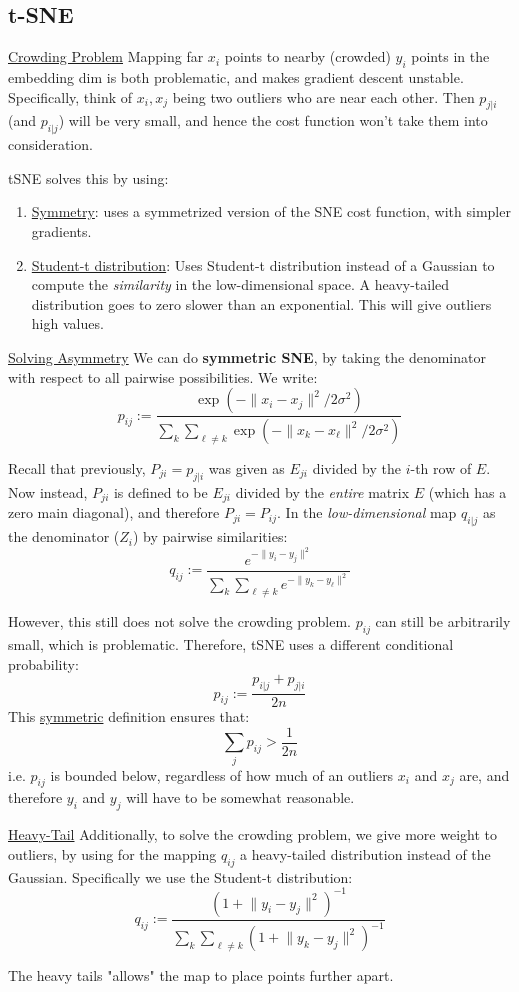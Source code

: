 \documentclass{article}
\begin{document}
\subsection{t-SNE}
\ul{Crowding Problem} Mapping far $x_i$ points to nearby (crowded) $y_i$  points in the embedding dim is both problematic, and makes gradient descent unstable. Specifically, think of $x_i, x_j$ being two outliers who are near each other. Then $p_{j|i}$ (and $p_{i|j}$) will be very small, and hence the cost function won't take them into consideration. 

tSNE solves this by using:
\begin{enumerate}

  \item \ul{Symmetry}: uses a symmetrized version of the SNE cost function, with simpler gradients.
  \item \ul{Student-t distribution}: Uses Student-t distribution instead of a Gaussian to compute the \textit{similarity} in the low-dimensional space. A heavy-tailed distribution goes to zero slower than an exponential. This will give outliers high values.  

\end{enumerate}


\ul{Solving Asymmetry} We can do \textbf{symmetric SNE}, by taking the denominator with respect to all pairwise possibilities. We write:
\[
  p_{ij} := \frac{\exp(- \lVert x_i -x_j \rVert^2 / 2 \sigma ^2) } {\sum_{k} \sum_{\ell \neq k } \exp(- \lVert x_k - x_{\ell} \rVert ^2 / 2 \sigma ^2 ) }
\]

Recall that previously, $P_{ji}=p_{j|i}$ was given as $E_{ji}$ divided by the $i$-th row of $E$. Now instead, $P_{ji}$ is defined to be $E_{ji}$ divided by the \textit{entire} matrix $E$ (which has a zero main diagonal), and therefore $P_{ji}=P_{ij}$. 
In the \textit{low-dimensional} map $q_{i|j}$ as  the denominator ($Z_i$) by pairwise similarities:
\[
  q_{ij} := \frac{e^{- \lVert y_i -y_j \rVert^2 } } {\sum_{k} \sum_{\ell \neq k } e^{- \lVert y_k - y_{\ell} \rVert ^2}   } 
\]

However, this still does not solve the crowding problem. $p_{ij}$ can still be arbitrarily small, which is problematic. Therefore, tSNE uses a different conditional probability:
  \[
    p_{ij} := \frac{p_{i|j} + p_{j|i}}{2n}
  \]
This \ul{symmetric} definition ensures that:
\[
  \sum_{j} p_{ij} > \frac{1}{2n}
\]
i.e. $p_{ij}$ is bounded below, regardless of how much of an outliers $x_i$ and $x_j$ are, and therefore $y_i$ and $y_j$ will have to be somewhat reasonable.  


\ul{Heavy-Tail} Additionally, to solve the crowding problem, we give more weight to outliers, by using for the mapping $q_{ij}$ a heavy-tailed distribution instead of the Gaussian. Specifically we use the Student-t distribution:
\[
  q_{ij} := \frac{(1 + \lVert y_i-y_j \rVert ^2)^{-1} }{ \sum_{k} \sum_{\ell \neq  k } (1 + \lVert y_k - y_j \rVert ^2 ) ^{-1}}
\]

The heavy tails "allows" the map to place points further apart. 
\end{document}
